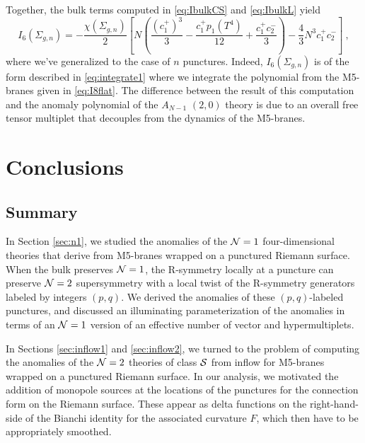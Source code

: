 \documentclass[a4paper,11pt]{article}
\def\CN{{\cal N}}
\def\CS{{\cal S}}
\begin{document}
Together, the bulk terms  computed in \eqref{eq:IbulkCS} and \eqref{eq:IbulkL} yield
	\begin{equation}
	I_6(\Sigma_{g,n}) = -\frac{\chi(\Sigma_{g,n})}{2} \left[ N  \left( \frac{(c_1^+)^3}{3}-	\frac{c_1^+p_1(T^4)}{12} + \frac{c_1^+ c_2^-}{3}\right)- \frac{4}{3} N^3 c_1^+ c_2^- \right]\ , 	\label{eq:answer1}
	\end{equation} 
where we've generalized to the case of $n$ punctures. Indeed, $I_6(\Sigma_{g,n})$ is of the form described in \eqref{eq:integrate1} where we integrate the polynomial from the M5-branes given in \eqref{eq:I8flat}.  The difference between the result of this computation and the anomaly polynomial of the $A_{N-1}$ $(2,0)$ theory is due to an overall free  tensor multiplet that decouples from the dynamics of the M5-branes.  





	


\section{Conclusions}

\subsection{Summary}


In Section \ref{sec:n1}, we studied the anomalies of the $\CN=1$ four-dimensional theories that derive from M5-branes wrapped on a punctured Riemann surface. When the bulk preserves $\CN=1$, the R-symmetry locally at a puncture can preserve $\CN=2$ supersymmetry with a local twist of the R-symmetry generators labeled by integers $(p,q)$. We derived the anomalies of these $(p,q)$-labeled punctures, and discussed an illuminating parameterization of the anomalies in terms of an $\CN=1$ version of an effective number of vector and hypermultiplets.

In Sections \ref{sec:inflow1} and \ref{sec:inflow2}, we turned to the problem of computing the anomalies of the $\CN=2$ theories of class $\CS$ from inflow for M5-branes wrapped on a punctured Riemann surface. In our analysis, we motivated the addition of monopole sources at the locations of the punctures for the connection form on the Riemann surface. These appear as delta functions on the right-hand-side of the Bianchi identity for the associated curvature $F$, which then have to be appropriately smoothed.
\end{document}
